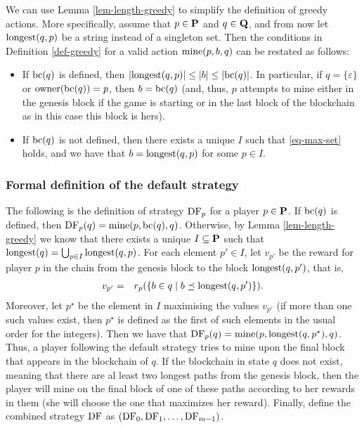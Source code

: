We can use Lemma \ref{lem-length-greedy} to simplify the definition of greedy actions. More specifically, assume that $p \in \mathbf{P}$ and $q \in \mathbf{Q}$, and from now let ${\text{\rm longest}}(q,p)$ be a string instead of a singleton set. Then the conditions in Definition \ref{def-greedy} for a valid action $\text{\rm mine}(p,b,q)$ can be restated as follows:
\begin{itemize}
\item If $\text{bc}(q)$ is defined, then $|{\text{\rm longest}}(q,p)| \leq |b|  \leq |\text{bc}(q)|$. In particular, 
if $q = \{\varepsilon\}$ or $\text{\rm owner}(\text{bc}(q)) = p$, then $b = \text{bc}(q)$ (and, thus, $p$ attempts to mine either in the genesis block if the game is starting or in the last block of the blockchain as in this case this block is hers).



\item If $\text{bc}(q)$ is not defined, then there exists a unique $I$ such that \eqref{eq-max-set} holds, and we have that $b = {\text{\rm longest}}(q,p)$ for some $p \in I$.
\end{itemize}

\subsubsection{Formal definition of the default strategy}

The following is the definition of strategy $\text{\rm DF}_p$ for a player $p \in \mathbf{P}$. If $\text{bc}(q)$ is defined, then $\text{\rm DF}_p(q) = \text{\rm mine}(p,\text{bc}(q),q)$. Otherwise, by Lemma \ref{lem-length-greedy} we know that there exists a unique $I \subseteq \mathbf{P}$ such that ${\text{\rm longest}}(q) = \bigcup_{p \in I} {\text{\rm longest}}(q,p)$. For each element $p' \in I$, let $v_{p'}$ be the reward for player $p$ in the chain from the genesis block to the block ${\text{\rm longest}}(q,p')$, that is,
\begin{eqnarray*}
v_{p'} & = & r_p(\{b \in q \mid b \preceq {\text{\rm longest}}(q,p')\}).
\end{eqnarray*}
Moreover, let $p^\star$ be the element in $I$ maximising the values $v_{p'}$ (if more than one such values exist, then $p^\star$  is defined as the first of such elements in the usual order for the integers). Then we have that $\text{\rm DF}_p(q) = \text{\rm mine}(p,{\text{\rm longest}}(q,p^\star),q)$.
Thus, a player following the default strategy tries to mine upon the final block that appears in the blockchain of $q$. If the blockchain in state $q$ does not exist, meaning that there are al least two longest paths from the genesis block, then the player will mine on the final block of one of these paths according to her rewards in them (she will choose the one that maximizes her reward). Finally, define the combined strategy $\text{\rm DF}$ as $(\text{\rm DF}_0,\text{\rm DF}_1,\dots,\text{\rm DF}_{m-1})$. 

